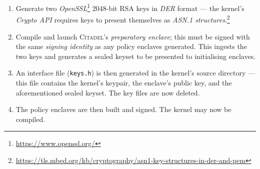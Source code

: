 \begin{enumerate}
    \item Generate two \textit{OpenSSL}\footnote{\url{https://www.openssl.org/}} 2048-bit RSA keys in \textit{DER} format --- the kernel's \textit{Crypto API} requires keys to present themselves as \textit{ASN.1 structures}.\footnote{\url{https://tls.mbed.org/kb/cryptography/asn1-key-structures-in-der-and-pem}}
    \item Compile and launch \textsc{Citadel}'s \textit{preparatory enclave}; this must be signed with the same \textit{signing identity} as any policy enclaves generated. This ingests the two keys and generates a sealed keyset to be presented to initialising enclaves.
    \item An interface file (\texttt{keys.h}) is then generated in the kernel's source directory --- this file contains the kernel's keypair, the enclave's public key, and the aforementioned sealed keyset. The key files are now deleted.
    \item The policy enclaves are then built and signed. The kernel may now be compiled.
\end{enumerate}
